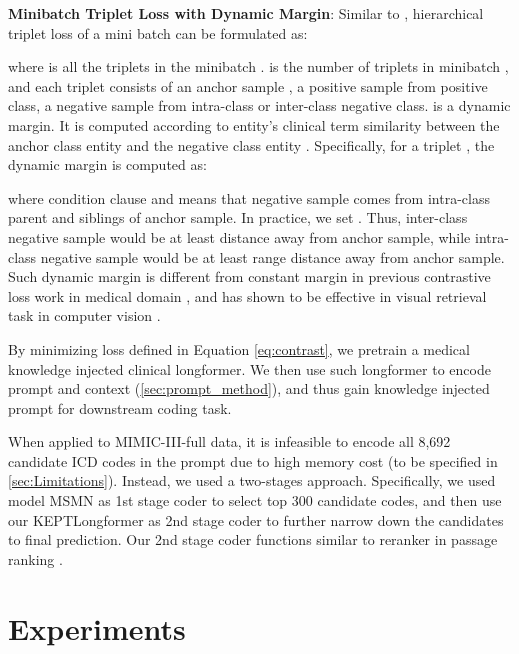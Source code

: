 \documentclass[11pt]{article}
\begin{document}
\textbf{Minibatch Triplet Loss with Dynamic Margin}:
Similar to \citet{Ge2018DeepML}, hierarchical triplet loss of a mini batch  can be formulated as: 

\small

\normalsize

\noindent where  is all the triplets in the minibatch .  is the number of triplets in minibatch , and each triplet  consists of an anchor sample ,
a positive sample  from positive class, a negative sample  from intra-class or inter-class negative class.  is a dynamic margin. It is computed according to entity's clinical term similarity between the anchor class entity and the negative class entity \citep{Zakharov20173DOI}. Specifically, for a triplet , the dynamic margin  is computed as:

\small

\normalsize

\noindent where condition clause  and  means that negative sample  comes from intra-class parent and siblings of anchor sample. In practice, we set . 
Thus, inter-class negative sample would be at least  distance away from anchor sample, while intra-class negative sample would be at least  range distance away from anchor sample.
Such dynamic margin is different from constant margin in previous contrastive loss work in medical domain \citep{liu-etal-2021-self, Zhang2021KnowledgeRichSF}, and has shown to be effective in visual retrieval task in computer vision \citep{Ge2018DeepML}.



By minimizing loss defined in Equation \ref{eq:contrast}, we pretrain a medical knowledge injected clinical longformer. We then use such longformer to encode prompt and context (\textsection \ref{sec:prompt_method}), and thus gain knowledge injected prompt for downstream coding task. 

When applied to MIMIC-III-full data, it is infeasible to encode all 8,692 candidate ICD codes in the prompt
due to high memory cost (to be specified in \textsection \ref{sec:Limitations}). Instead, we used a two-stages approach. Specifically, we used model MSMN as 1st stage coder to select top 300 candidate codes, and then use our KEPTLongformer as 2nd stage coder to further narrow down the candidates to final prediction. Our 2nd stage coder functions similar to reranker in passage ranking \citep{Nogueira2019PassageRW}.


\section{Experiments}
\end{document}
